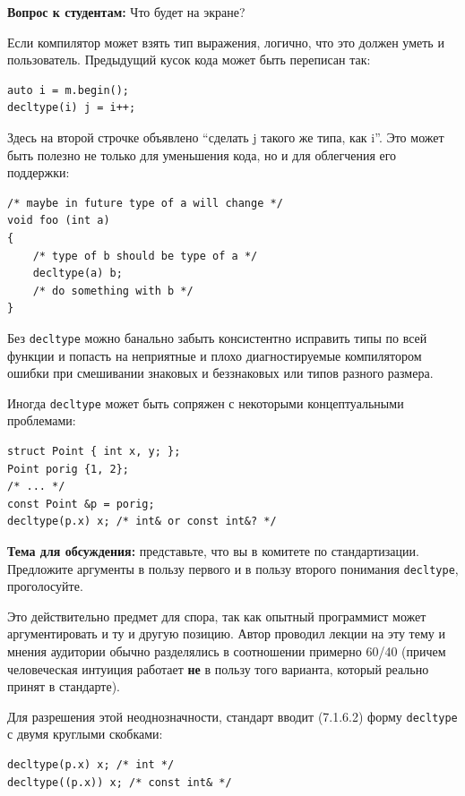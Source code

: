 \documentclass[a4paper,12pt,oneside]{article}
\newif\ifanswers
\begin{document}
\textbf{Вопрос к студентам:} Что будет на экране?

\ifanswers
Правильный ответ: внезапно на экране будет Hello World.
\fi

Если компилятор может взять тип выражения, логично, что это должен уметь и пользователь. Предыдущий кусок кода может быть переписан так:

\begin{lstlisting}
auto i = m.begin(); 
decltype(i) j = i++;
\end{lstlisting}

Здесь на второй строчке объявлено ``сделать j такого же типа, как i''. Это может быть полезно не только для уменьшения кода, но и для облегчения его поддержки:

\begin{lstlisting}
/* maybe in future type of a will change */
void foo (int a)
{
    /* type of b should be type of a */
    decltype(a) b;
    /* do something with b */
}
\end{lstlisting}

Без \lstinline!decltype! можно банально забыть консистентно исправить типы по всей функции и попасть на неприятные и плохо диагностируемые компилятором ошибки при смешивании знаковых и беззнаковых или типов разного размера.

Иногда \lstinline!decltype! может быть сопряжен с некоторыми концептуальными проблемами:

\begin{lstlisting}
struct Point { int x, y; };
Point porig {1, 2};
/* ... */
const Point &p = porig;
decltype(p.x) x; /* int& or const int&? */
\end{lstlisting}

\textbf{Тема для обсуждения:} представьте, что вы в комитете по стандартизации. Предложите аргументы в пользу первого и в пользу второго понимания \lstinline!decltype!, проголосуйте.

Это действительно предмет для спора, так как опытный программист может аргументировать и ту и другую позицию. Автор проводил лекции на эту тему и мнения аудитории обычно разделялись в соотношении примерно 60/40 (причем человеческая интуиция работает \textbf{не} в пользу того варианта, который реально принят в стандарте).

Для разрешения этой неоднозначности, стандарт вводит (7.1.6.2) форму \lstinline!decltype! с двумя круглыми скобками:

\begin{lstlisting}
decltype(p.x) x; /* int */
decltype((p.x)) x; /* const int& */
\end{lstlisting}
\end{document}
